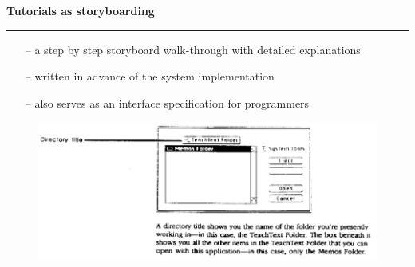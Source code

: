 \documentclass[pdf]{beamer}
\begin{document}
\begin{frame}
\vspace{8mm}
\textcolor{myBlue}{\textbf{\Large{Tutorials as storyboarding}}}

\textcolor{red}{\rule{10cm}{1mm}}

\begin{itemize}
\item [--]a step by step storyboard walk-through with detailed explanations
\item[--]written in advance of the system implementation
\item[--]also serves as an interface specification for programmers
\end{itemize}

	\begin{figure}[b]
      \includegraphics[scale = 0.47, right]{24_Picture1.png}
  	\end{figure}

\raggedright 
\fontsize{2pt}{1pt}
 
\end{frame}
\end{document}
